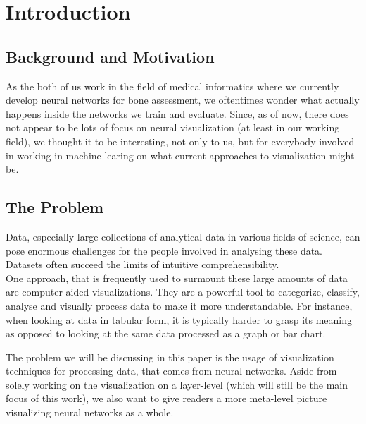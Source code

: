 \documentclass{acmsiggraph}               %
\begin{document}
\keywordlist

\section{Introduction}


\copyrightspace

\subsection{Background and Motivation}
As the both of us work in the field of medical informatics where we currently develop neural networks for bone assessment, we oftentimes wonder what actually happens inside the networks we train and evaluate. Since, as of now, there does not appear to be lots of focus on neural visualization (at least in our working field), we thought it to be interesting, not only to us, but for everybody involved in working in machine learing on what current approaches to visualization might be.

\subsection{The Problem}
Data, especially large collections of analytical data in various fields of science, can pose enormous challenges for the people involved in analysing these data. Datasets often succeed the limits of intuitive comprehensibility.\\
One approach, that is frequently used to surmount these large amounts of data are computer aided visualizations. They are a powerful tool to categorize, classify, analyse and visually process data to make it more understandable. For instance, when looking at data in tabular form, it is typically harder to grasp its meaning as opposed to looking at the same data processed as a graph or bar chart.

The problem we will be discussing in this paper is the usage of visualization techniques for processing data, that comes from neural networks. Aside from solely working on the visualization on a layer-level (which will still be the main focus of this work), we also want to give readers a more meta-level picture visualizing neural networks as a whole.
\end{document}
